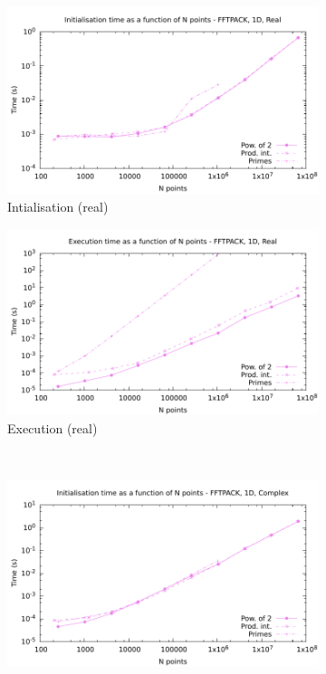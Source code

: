 \documentclass[12pt, a4paper]{article}
\begin{document}
\begin{figure}[H]
\captionsetup{width=0.8\linewidth}
\centering
\begin{subfigure}{.5\textwidth}
\centering
\includegraphics[width=.9\linewidth]{graphs/1d-fftpack-init-r.pdf}
\caption{Intialisation (real)}
\label{1DFFTPACKRI}
\end{subfigure}%
\begin{subfigure}{.5\textwidth}
\centering
\includegraphics[width=.9\linewidth]{graphs/1d-fftpack-exec-r.pdf}
\caption{Execution (real)}
\label{1DFFTPACKR}
\end{subfigure}\\
\begin{subfigure}{.5\textwidth}
\centering
\includegraphics[width=.9\linewidth]{graphs/1d-fftpack-init-c.pdf}

\end{subfigure}
\end{figure}
\end{document}
